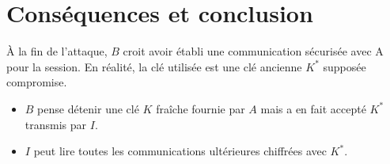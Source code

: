 \documentclass[11pt]{article}
\begin{document}
\section{Conséquences et conclusion}

\noindent
À la fin de l'attaque, $B$ croit avoir établi une communication sécurisée avec A pour la session. En réalité, la clé utilisée est une clé ancienne $K^*$ supposée compromise.

\begin{itemize}
    \item $B$ pense détenir une clé $K$ fraîche fournie par $A$ mais a en fait accepté $K^*$ transmis par $I$.
    \item $I$ peut lire toutes les communications ultérieures chiffrées avec $K^*$.
\end{itemize}
\end{document}
